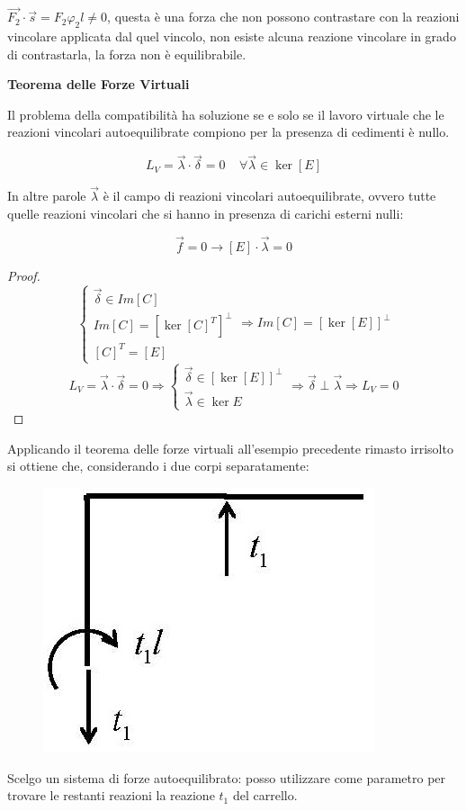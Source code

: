 \documentclass{article}
\begin{document}
\begin{adjustwidth}{2in}{}
	$\vec{F_2} \cdot \vec{s} =F_2\varphi_2l\ne 0$, questa è una forza che non possono contrastare con la reazioni vincolare applicata dal quel vincolo, non esiste alcuna reazione vincolare in grado di contrastarla, la forza non è equilibrabile. \newline 

 \newpage

  {\Large \textbf{Teorema delle Forze Virtuali}} \mbox{} \newline
  
  \begin{thm}
  	Il problema della compatibilità ha soluzione se e solo se il lavoro virtuale che le reazioni vincolari autoequilibrate compiono per la presenza di cedimenti è nullo.
  \end{thm}

  \[
  L_V = \vec{\lambda} \cdot \vec{\delta} = 0 ~~~~~ \forall  \vec{\lambda} \in \ker[E]
  \]
  
  In altre parole $\vec{\lambda}$ è il campo di reazioni vincolari autoequilibrate, ovvero tutte quelle reazioni vincolari che si hanno in presenza di carichi esterni nulli:
  
  \[
  \vec{f} = 0 \rightarrow [E] \cdot \vec{\lambda} = 0
  \]
  \begin{proof}
  	\[
  	\begin{cases}
  		\vec{\delta} \in Im[C] \\
  		Im[C] = [\ker[C]^T]^{\perp} \\
  		[C]^T = [E]
  	\end{cases} \Rightarrow Im[C] = [\ker[E]]^{\perp}
  	\]
  	\[
  	L_V = \vec{\lambda} \cdot \vec{\delta} = 0 \Rightarrow \begin{cases}
  		\vec{\delta} \in [\ker[E]]^{\perp} \\ 
  		\vec{\lambda} \in \ker{E}
  	\end{cases} \Rightarrow \vec{\delta} \perp \vec{\lambda} \Rightarrow L_V = 0
  	\]
  \end{proof} 
  
 Applicando il teorema delle forze virtuali all'esempio precedente rimasto irrisolto si ottiene che, considerando i due corpi separatamente: 
  \begin{figure}[H]
 	\centering
 	\includegraphics[width=0.25\linewidth]{immagini/1.PARTE4_Pagina_11 (2)}
 \end{figure}
  Scelgo un sistema di forze autoequilibrato: posso utilizzare come parametro per trovare le restanti reazioni la reazione $t_1$ del carrello. \newline
 

\end{adjustwidth}
\end{document}
